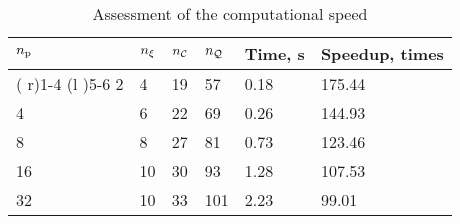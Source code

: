 \begin{table}[t]
  \centering
  \caption{Assessment of the computational speed}
  \vspace{-0.5em}
  \begin{tabular*}{1\linewidth}{R{20pt}R{20pt}R{20pt}R{20pt}R{50pt}R{50pt}}
    \toprule
    ${n_\text{p}}$ & ${n_\xi}$ & ${n_\mathcal{C}}$ & ${n_\mathcal{Q}}$ & Time, s & Speedup, times \\
    \cmidrule( r){1-4}
    \cmidrule(l ){5-6}
     2 &  4 & 19 &  57 & 0.18 & 175.44 \\
     4 &  6 & 22 &  69 & 0.26 & 144.93 \\
     8 &  8 & 27 &  81 & 0.73 & 123.46 \\
    16 & 10 & 30 &  93 & 1.28 & 107.53 \\
    32 & 10 & 33 & 101 & 2.23 &  99.01 \\
    \bottomrule
  \end{tabular*}
\end{table}
